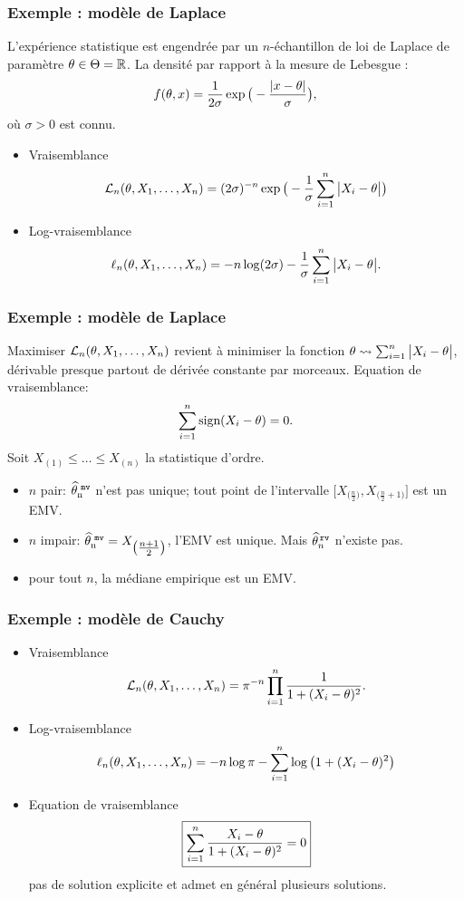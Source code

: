 \begin{frame}
\frametitle{Exemple : modèle de Laplace} L'expérience statistique
est engendrée par un $n$-échantillon de loi de Laplace de paramètre
$\theta \in \Theta = \operatorname{{\mathbb R}}$. La densité par rapport à la mesure de
Lebesgue :
$$f(\theta,x) = \frac{1}{2\sigma}\exp\big(-\frac{|x-\theta|}{\sigma}\big),$$
où $\sigma >0$ est \alert{connu}.
\begin{itemize}
\item \alert{Vraisemblance}
$${\mathcal L}_n(\theta, X_1,\ldots, X_n) = (2\sigma)^{-n}
\exp\big(-\frac{1}{\sigma}\sum_{i = 1}^n \big|X_i-\theta\big|\big)$$
\item \alert{Log-vraisemblance}
$$\ell_n(\theta,X_1,\ldots, X_n) = - n \log(2\sigma)-
\frac{1}{\sigma}\sum_{i = 1}^n \big|X_i-\theta\big|.$$
\end{itemize}
\end{frame}

\begin{frame}
\frametitle{Exemple : modèle de Laplace} Maximiser ${\mathcal
L}_n(\theta, X_1,\ldots, X_n)$ revient à minimiser la fonction
$\theta \leadsto \sum_{i = 1}^n \big|X_i-\theta\big|$,
dérivable presque partout de dérivée constante par morceaux.
\alert{Equation de vraisemblance:}
$$\sum_{i = 1}^n \text{sign}(X_i-\theta)=0.$$
Soit $X_{(1)}\leq \ldots \leq X_{(n)}$ la statistique d'ordre.
\begin{itemize}
\item
$n$ pair: $\operatorname{\widehat \theta_n^{\,\,{\tt mv}}}$ \alert{n'est pas unique}; tout point de
l'intervalle
$\big[X_{\big(\tfrac{n}{2}\big)},X_{\big(\tfrac{n}{2}+1\big)} \big]$
est un EMV.
\item $n$ impair: $\operatorname{\widehat \theta_n^{\,\,{\tt mv}}}=X_{\big(\tfrac{n+1}{2}\big)}$,
l'EMV est unique. Mais $\widehat {\theta}_n^{\,{\tt rv}}$ n'existe
pas.
\item \alert{pour tout} $n$, la
médiane empirique est un EMV.
\end{itemize}
\end{frame}

\begin{frame}
\frametitle{Exemple : modèle de Cauchy}
\begin{itemize}
\item \alert{Vraisemblance}
$${\mathcal L}_n(\theta, X_1,\ldots, X_n) = \pi^{-n} \prod_{i =1}^n \frac{1}{1+(X_i-\theta)^2}.$$
\item \alert{Log-vraisemblance}
$$\ell_n(\theta,X_1,\ldots, X_n) = -n\log \pi -\sum_{i = 1}^n \log\big(1+(X_i-\theta)^2\big)$$
\item \alert{Equation de vraisemblance}
$$\boxed{\sum_{i = 1}^n \frac{X_i-\theta}{1+(X_i-\theta)^2}=0}$$
pas de solution explicite et admet en général plusieurs solutions.
\end{itemize}
\end{frame}



